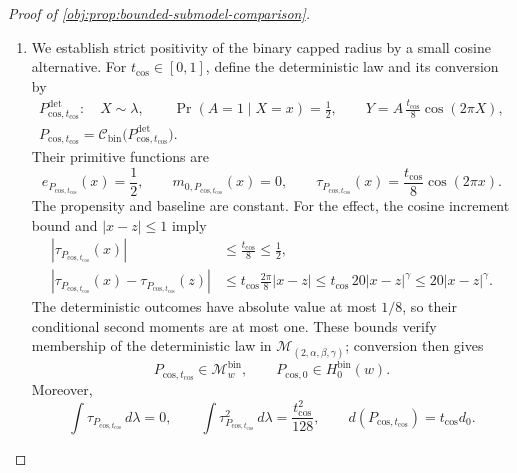 \begin{proof}[Proof of \cref{obj:prop:bounded-submodel-comparison}]
\begin{enumerate}
\item We establish strict positivity of the binary capped radius by a small cosine alternative. For \(t_{\mathrm{cos}}\in[0,1]\), define the deterministic law and its conversion by
\[
\begin{gathered}
P^{\mathrm{det}}_{\mathrm{cos},t_{\mathrm{cos}}}:
\quad X\sim\lambda,\qquad
\Pr(A=1\mid X=x)=\frac12,\qquad
Y=A\,\frac{t_{\mathrm{cos}}}{8}\cos(2\pi X),\\
P_{\mathrm{cos},t_{\mathrm{cos}}}
=\mathcal C_{\mathrm{bin}}
 \bigl(P^{\mathrm{det}}_{\mathrm{cos},t_{\mathrm{cos}}}\bigr).
\end{gathered}
\]
Their primitive functions are
\[
e_{P_{\mathrm{cos},t_{\mathrm{cos}}}}(x)=\frac12,\qquad
m_{0,P_{\mathrm{cos},t_{\mathrm{cos}}}}(x)=0,\qquad
\tau_{P_{\mathrm{cos},t_{\mathrm{cos}}}}(x)
=\frac{t_{\mathrm{cos}}}{8}\cos(2\pi x).
\]
The propensity and baseline are constant. For the effect, the cosine increment bound and \(|x-z|\le1\) imply
\[
\begin{split}
|\tau_{P_{\mathrm{cos},t_{\mathrm{cos}}}}(x)|
&\le\frac{t_{\mathrm{cos}}}{8}\le\frac12,\\
|\tau_{P_{\mathrm{cos},t_{\mathrm{cos}}}}(x)
 -\tau_{P_{\mathrm{cos},t_{\mathrm{cos}}}}(z)|
&\le t_{\mathrm{cos}}\frac{2\pi}{8}|x-z|
 \le t_{\mathrm{cos}}\,20|x-z|^\gamma
 \le20|x-z|^\gamma.
\end{split}
\]
The deterministic outcomes have absolute value at most \(1/8\), so their conditional second moments are at most one. These bounds verify membership of the deterministic law in
\(\mathcal M_{(2,\alpha,\beta,\gamma)}\); conversion then gives
\[
P_{\mathrm{cos},t_{\mathrm{cos}}}\in\mathcal M_w^{\mathrm{bin}},
\qquad
P_{\mathrm{cos},0}\in H_0^{\mathrm{bin}}(w).
\]
Moreover,
\[
\int\tau_{P_{\mathrm{cos},t_{\mathrm{cos}}}}\,d\lambda=0,\qquad
\int\tau_{P_{\mathrm{cos},t_{\mathrm{cos}}}}^2\,d\lambda
=\frac{t_{\mathrm{cos}}^2}{128},
\qquad
d(P_{\mathrm{cos},t_{\mathrm{cos}}})=t_{\mathrm{cos}}d_0.
\]


\end{enumerate}
\end{proof}
